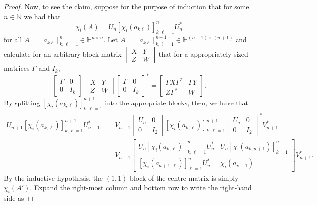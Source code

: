 \documentclass[10pt,a4paper]{amsart}
\def\HH{\mathbb{H}}
\def\NN{\mathbb{N}}
\def\x{\chi}
\begin{document}
\begin{proof}
    Now, to see the claim, suppose for the purpose of induction that for some \(n \in \NN\) we had that
    \[
        \x_i(A) = U_n [\x_i(a_{k\ell})]_{k,\ell=1}^n U_n^*
    \]
    for all \(A = [a_{k\ell}]_{k,\ell=1}^n \in \HH^{n\times n}\). Let \(A = [a_{k\ell}]_{k,\ell=1}^{n+1} \in \HH^{(n+1)\times(n+1)}\) and calculate for an arbitrary block matrix \(\begin{bmatrix} X & Y \\ Z & W \end{bmatrix}\) that for a appropriately-sized matrices \(\Gamma\) and \(I_k\),
    \[
        \begin{bmatrix} \Gamma & 0 \\ 0 & I_k \end{bmatrix} \begin{bmatrix} X & Y \\ Z & W \end{bmatrix} \begin{bmatrix} \Gamma & 0 \\ 0 & I_k\end{bmatrix}^* = \begin{bmatrix} \Gamma X \Gamma^* & \Gamma Y \\ Z \Gamma^* & W \end{bmatrix}.
    \]
    By splitting \([\x_i(a_{k,\ell})]_{k,\ell=1}^{n+1}\) into the appropriate blocks, then, we have that
    \begin{equation}
    \label{eq:UnitaryEquivLemma}
        \begin{split}
            U_{n+1} [\x_i(a_{k,\ell})]_{k,\ell=1}^{n+1} U_{n+1}^* & = V_{n+1} \begin{bmatrix} U_n & 0 \\ 0 & I_2 \end{bmatrix} [\x_i(a_{k,\ell})]_{k,\ell=1}^{n+1} \begin{bmatrix} U_n & 0 \\ 0 & I_2 \end{bmatrix}^* V_{n+1}^* \\
            & = V_{n+1} \begin{bmatrix} U_n [\x_i(a_{k,\ell})]_{k,\ell=1}^n U_n^* & U_n [\x_i(a_{k,n+1})]_{k=1}^n \\[6pt] [\x_i(a_{n+1,\ell})]_{\ell=1}^n U_n^* & \x_i(a_{n+1}) \end{bmatrix} V_{n+1}^*. 
        \end{split}
    \end{equation}
    By the inductive hypothesis, the \((1,1)\)-block of the centre matrix is simply \(\x_i(A')\). Expand the right-most column and bottom row to write the right-hand side as

\end{proof}
\end{document}
